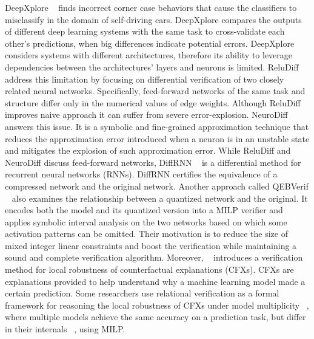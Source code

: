 DeepXplore ~\cite{DEEPXPLORE} finds incorrect corner case behaviors that cause the classifiers to misclassify in the domain of self-driving cars. DeepXplore compares the outputs of different deep learning systems with the same task to cross-validate each other’s predictions, when big differences indicate potential errors. DeepXplore considers systems with different architectures, therefore its ability to leverage dependencies between the architectures' layers and neurons is limited. ReluDiff ~\cite{RELUDIFF} address this limitation by focusing on differential verification of two closely related neural networks. Specifically, feed-forward networks of the same task and structure differ only in the numerical values of edge weights. Although ReluDiff improves naive approach it can suffer from severe error-explosion. NeuroDiff ~\cite{NEURODIFF} answers this issue. It is a symbolic and fine-grained approximation technique that reduces the approximation error introduced when a neuron is in an unstable state and mitigates the explosion of such approximation error. While ReluDiff and NeuroDiff discuss feed-forward networks, DiffRNN ~\cite{DIFFRNN} is a differential method for recurrent neural networks (RNNs). DiffRNN certifies the equivalence of a compressed network and the original network. Another approach called QEBVerif ~\cite{QEBVERIF} also examines the relationship between a quantized network and the original. It encodes both the model and its quantized version into a MILP verifier and applies symbolic interval analysis on the two networks based on which some activation patterns can be omitted. Their motivation is to reduce the size of mixed integer linear constraints and boost the verification while maintaining a sound and complete verification algorithm. Moreover, ~\cite{CFXROBUSTNESS} introduces a verification method for local robustness of counterfactual explanations (CFXs). CFXs are explanations provided to help understand why a machine learning model made a certain prediction. Some researchers use relational verification as a formal framework for reasoning the local robustness of CFXs under model multiplicity  ~\cite{CFXROBUSTNESS}, where multiple models achieve the same accuracy on a prediction task, but differ in their internals ~\cite{PREDICTIVEMULTIPICITY}, using MILP.

